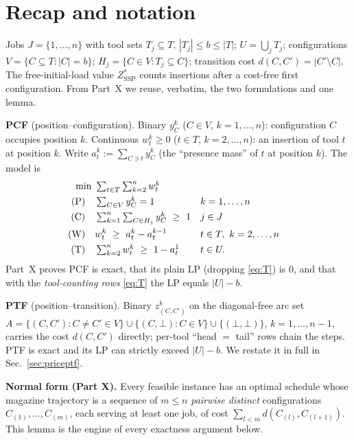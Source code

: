 \documentclass[11pt,a4paper]{article}
\theoremstyle{plain}
\theoremstyle{definition}
\newcommand{\ZSSP}{Z_{\mathrm{SSP}}^{*}}
\begin{document}
\vspace{0.3cm}
\tableofcontents
\newpage

\section{Recap and notation}\label{sec:recap}
Jobs $J=\{1,\dots,n\}$ with tool sets $T_j\subseteq T$, $|T_j|\le b\le|T|$;
$U=\bigcup_jT_j$; configurations $V=\{C\subseteq T:|C|=b\}$;
$H_j=\{C\in V:T_j\subseteq C\}$; transition cost $d(C,C')=|C'\setminus C|$. The
free-initial-load value $\ZSSP$ counts insertions after a cost-free first configuration. From
Part~X we reuse, verbatim, the two formulations and one lemma.

\textbf{PCF} (position--configuration). Binary $y_C^k$ ($C\in V$, $k=1,\dots,n$): configuration
$C$ occupies position $k$. Continuous $w_t^k\ge0$ ($t\in T$, $k=2,\dots,n$): an insertion of
tool $t$ at position $k$. Write $a_t^k:=\sum_{C\ni t}y_C^k$ (the ``presence mass'' of $t$ at
position $k$). The model is
\begin{align}
  \min\ & \textstyle\sum_{t\in T}\sum_{k=2}^{n} w_t^k \notag\\
  \text{(P)}\quad & \textstyle\sum_{C\in V} y_C^k = 1 && k=1,\dots,n \label{eq:P}\\
  \text{(C)}\quad & \textstyle\sum_{k=1}^{n}\sum_{C\in H_j} y_C^k \ \ge\ 1 && j\in J \label{eq:C}\\
  \text{(W)}\quad & w_t^k \ \ge\ a_t^k - a_t^{k-1} && t\in T,\ k=2,\dots,n \label{eq:W}\\
  \text{(T)}\quad & \textstyle\sum_{k=2}^{n} w_t^k \ \ge\ 1 - a_t^1 && t\in U. \label{eq:T}
\end{align}
Part~X proves PCF is exact, that its plain LP (dropping \eqref{eq:T}) is $0$, and that with the
\emph{tool-counting rows} \eqref{eq:T} the LP equals $|U|-b$.

\textbf{PTF} (position--transition). Binary $z^k_{(C,C')}$ on the diagonal-free arc set
$A=\{(C,C'):C\neq C'\in V\}\cup\{(C,\bot):C\in V\}\cup\{(\bot,\bot)\}$, $k=1,\dots,n-1$, carries
the cost $d(C,C')$ directly; per-tool ``head $=$ tail'' rows chain the steps. PTF is exact and
its LP can strictly exceed $|U|-b$. We restate it in full in Sec.~\ref{sec:priceptf}.

\textbf{Normal form (Part X).} Every feasible instance has an optimal schedule whose magazine
trajectory is a sequence of $m\le n$ \emph{pairwise distinct} configurations
$C_{(1)},\dots,C_{(m)}$, each serving at least one job, of cost $\sum_{l<m}d(C_{(l)},C_{(l+1)})$.
This lemma is the engine of every exactness argument below.
\end{document}

